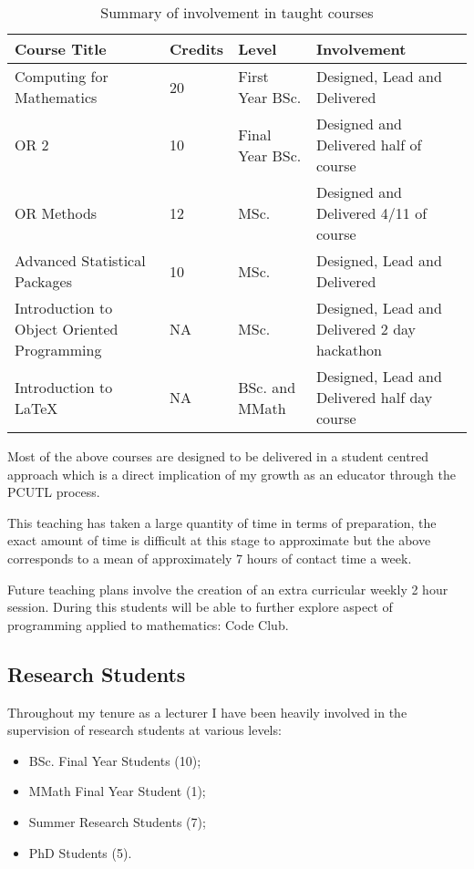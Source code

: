 \documentclass{article}
\begin{document}
\begin{table}[!htbp]
\begin{center}
\begin{tabular}{p{5cm}llp{6cm}}
\toprule
Course Title & Credits & Level & Involvement\\
\midrule
Computing for Mathematics & 20 &  First Year BSc. & Designed, Lead and Delivered\\
OR 2 & 10 &  Final Year BSc.  & Designed and Delivered half of course\\
OR Methods & 12 & MSc. & Designed and Delivered 4/11 of course\\
Advanced Statistical Packages & 10 &  MSc. & Designed, Lead and Delivered\\
Introduction to Object Oriented Programming & NA &  MSc. & Designed, Lead and Delivered 2 day hackathon\\
Introduction to \LaTeX & NA & BSc. and MMath & Designed, Lead and Delivered half day course\\
\bottomrule
\end{tabular}
\caption{Summary of involvement in taught courses}\label{tab:teaching}
\end{center}
\end{table}

Most of the above courses are designed to be delivered in a student centred approach which is a direct implication of my growth as an educator through the PCUTL process.

This teaching has taken a large quantity of time in terms of preparation, the exact amount of time is difficult at this stage to approximate but the above corresponds to a mean of approximately 7 hours of contact time a week.

Future teaching plans involve the creation of an extra curricular weekly 2 hour session.
During this students will be able to further explore aspect of programming applied to mathematics: Code Club.

\subsection{Research Students}

Throughout my tenure as a lecturer I have been heavily involved in the supervision of research students at various levels:

\begin{itemize}
    \item BSc. Final Year Students (10);
    \item MMath Final Year Student (1);
    \item Summer Research Students (7);
    \item PhD Students (5).
\end{itemize}
\end{document}
